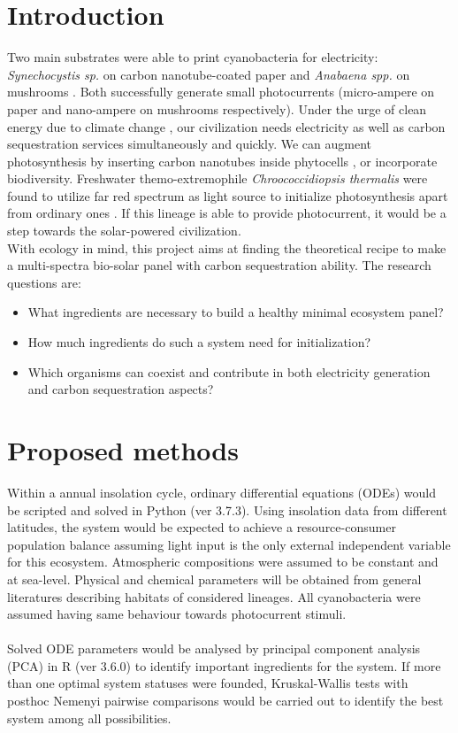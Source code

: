 \documentclass[a4paper, 11pt]{article}
\begin{document}
\section{Introduction}
Two main substrates were able to print cyanobacteria for electricity:  \textit{Synechocystis sp.} on carbon nanotube-coated paper \autocite{sawa2017electricity} and \textit{Anabaena spp.} on mushrooms \autocite{joshi2018bacterial}.  Both successfully generate small photocurrents (micro-ampere on paper \autocite{sawa2017electricity} and nano-ampere on mushrooms \autocite{joshi2018bacterial} respectively).  Under the urge of clean energy due to climate change \autocite{schuur2015climate}, our civilization needs electricity as well as carbon sequestration services simultaneously and quickly.  We can augment photosynthesis by inserting carbon nanotubes inside phytocells \autocite{giraldo2014plant}, or incorporate biodiversity.  Freshwater themo-extremophile \textit{Chroococcidiopsis thermalis} were found to utilize far red spectrum as light source to initialize photosynthesis apart from ordinary ones \autocite{nurnberg2018photochemistry}.  If this lineage is able to provide photocurrent, it would be a step towards the solar-powered civilization.\\

With ecology in mind, this project aims at finding the theoretical recipe to make a multi-spectra bio-solar panel with carbon sequestration ability.  The research questions are:

\begin{itemize}
	\item What ingredients are necessary to build a healthy minimal ecosystem panel?
	\item How much ingredients do such a system need for initialization?
	\item Which organisms can coexist and contribute in both electricity generation and carbon sequestration aspects?
\end{itemize}

\section{Proposed methods}
Within a annual insolation cycle, ordinary differential equations (ODEs) would be scripted and solved in Python (ver 3.7.3).  Using insolation data from different latitudes, the system would be expected to achieve a resource-consumer population balance assuming light input is the only external independent variable for this ecosystem.  Atmospheric compositions were assumed to be constant and at sea-level.  Physical and chemical parameters will be obtained from general literatures describing habitats of considered lineages.  All cyanobacteria were assumed having same behaviour towards photocurrent stimuli.\\\\
Solved ODE parameters would be analysed by principal component analysis (PCA) in R (ver 3.6.0) to identify important ingredients for the system.  If more than one optimal system statuses were founded, Kruskal-Wallis tests with posthoc Nemenyi pairwise comparisons would be carried out to identify the best system among all possibilities.
\end{document}
